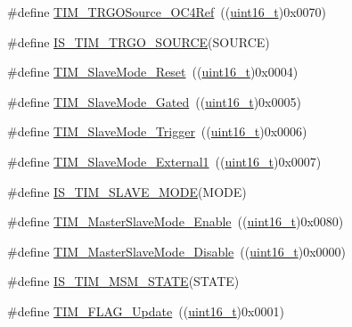 \begin{DoxyCompactItemize}
\item 
\#define \hyperlink{group___t_i_m___trigger___output___source_gafc81561599199912d613c65f760919bc}{T\+I\+M\+\_\+\+T\+R\+G\+O\+Source\+\_\+\+O\+C4\+Ref}~((\hyperlink{_p_e___types_8h_a1f1825b69244eb3ad2c7165ddc99c956}{uint16\+\_\+t})0x0070)
\item 
\#define \hyperlink{group___t_i_m___trigger___output___source_gadf4e4e0422bd9c108b184884781d2d46}{I\+S\+\_\+\+T\+I\+M\+\_\+\+T\+R\+G\+O\+\_\+\+S\+O\+U\+R\+CE}(S\+O\+U\+R\+CE)
\item 
\#define \hyperlink{group___t_i_m___slave___mode_gaac1cec731f1a5e680a038c4f472f74af}{T\+I\+M\+\_\+\+Slave\+Mode\+\_\+\+Reset}~((\hyperlink{_p_e___types_8h_a1f1825b69244eb3ad2c7165ddc99c956}{uint16\+\_\+t})0x0004)
\item 
\#define \hyperlink{group___t_i_m___slave___mode_ga1f36c870b926f70b32f274bbc0bc39a5}{T\+I\+M\+\_\+\+Slave\+Mode\+\_\+\+Gated}~((\hyperlink{_p_e___types_8h_a1f1825b69244eb3ad2c7165ddc99c956}{uint16\+\_\+t})0x0005)
\item 
\#define \hyperlink{group___t_i_m___slave___mode_ga9e7726c04ee1bafec97226f08adf5677}{T\+I\+M\+\_\+\+Slave\+Mode\+\_\+\+Trigger}~((\hyperlink{_p_e___types_8h_a1f1825b69244eb3ad2c7165ddc99c956}{uint16\+\_\+t})0x0006)
\item 
\#define \hyperlink{group___t_i_m___slave___mode_ga34427a693157ab177fead9871185bd35}{T\+I\+M\+\_\+\+Slave\+Mode\+\_\+\+External1}~((\hyperlink{_p_e___types_8h_a1f1825b69244eb3ad2c7165ddc99c956}{uint16\+\_\+t})0x0007)
\item 
\#define \hyperlink{group___t_i_m___slave___mode_ga7f0e666bc968c56df7f1f6c2465c89fb}{I\+S\+\_\+\+T\+I\+M\+\_\+\+S\+L\+A\+V\+E\+\_\+\+M\+O\+DE}(M\+O\+DE)
\item 
\#define \hyperlink{group___t_i_m___master___slave___mode_gaef5da910ae6952fce424b440ea39f69a}{T\+I\+M\+\_\+\+Master\+Slave\+Mode\+\_\+\+Enable}~((\hyperlink{_p_e___types_8h_a1f1825b69244eb3ad2c7165ddc99c956}{uint16\+\_\+t})0x0080)
\item 
\#define \hyperlink{group___t_i_m___master___slave___mode_ga8d4c7c0f57469f384b1327bb323d28a3}{T\+I\+M\+\_\+\+Master\+Slave\+Mode\+\_\+\+Disable}~((\hyperlink{_p_e___types_8h_a1f1825b69244eb3ad2c7165ddc99c956}{uint16\+\_\+t})0x0000)
\item 
\#define \hyperlink{group___t_i_m___master___slave___mode_ga53146701cf287a0eca43b9232dffac60}{I\+S\+\_\+\+T\+I\+M\+\_\+\+M\+S\+M\+\_\+\+S\+T\+A\+TE}(S\+T\+A\+TE)
\item 
\#define \hyperlink{group___t_i_m___flags_ga97eba66f792c88e08131bd0d2a0e530d}{T\+I\+M\+\_\+\+F\+L\+A\+G\+\_\+\+Update}~((\hyperlink{_p_e___types_8h_a1f1825b69244eb3ad2c7165ddc99c956}{uint16\+\_\+t})0x0001)

\end{DoxyCompactItemize}
